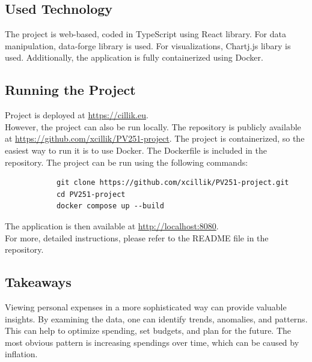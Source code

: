 \documentclass{article}
\begin{document}
    \subsection*{Used Technology}
        The project is web-based, coded in TypeScript using React library. For data manipulation, data-forge library is used. For visualizations, Chartj.js libary is used. Additionally, the application is fully containerized using Docker.

    \subsection*{Running the Project}
        Project is deployed at \url{https://cillik.eu}.\\[0.75em]
        However, the project can also be run locally. The repository is publicly available at \url{https://github.com/xcillik/PV251-project}. The project is containerized, so the easiest way to run it is to use Docker. The Dockerfile is included in the repository. The project can be run using the following commands:
        \begin{lstlisting}
            git clone https://github.com/xcillik/PV251-project.git
            cd PV251-project
            docker compose up --build
        \end{lstlisting}
        The application is then available at \url{http://localhost:8080}.\\[1em]
        For more, detailed instructions, please refer to the README file in the repository.
    
    \subsection*{Takeaways}
        Viewing personal expenses in a more sophisticated way can provide valuable insights. By examining the data, one can identify trends, anomalies, and patterns. This can help to optimize spending, set budgets, and plan for the future. The most obvious pattern is increasing spendings over time, which can be caused by inflation.
    
\end{document}
